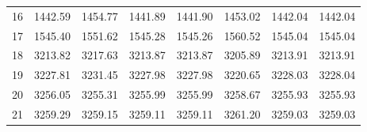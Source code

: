 \documentclass[10pt,oneside]{article}
\begin{document}
\begin{table}[h!]
\begin{tabular}{cccccccc}
16 &   1442.59 & 1454.77 & 1441.89 & 1441.90 &      1453.02 & 1442.04 & 1442.04 \\
17 &   1545.40 & 1551.62 & 1545.28 & 1545.26 &      1560.52 & 1545.04 & 1545.04 \\
18 &   3213.82 & 3217.63 & 3213.87 & 3213.87 &      3205.89 & 3213.91 & 3213.91 \\
19 &   3227.81 & 3231.45 & 3227.98 & 3227.98 &      3220.65 & 3228.03 & 3228.04 \\
20 &   3256.05 & 3255.31 & 3255.99 & 3255.99 &      3258.67 & 3255.93 & 3255.93 \\
21 &   3259.29 & 3259.15 & 3259.11 & 3259.11 &      3261.20 & 3259.03 & 3259.03 \\
\bottomrule
\end{tabular}
\end{table}

\clearpage
\end{document}
